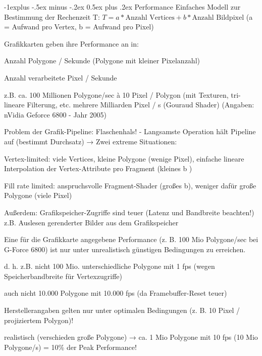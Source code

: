 \documentclass[landscape]{article}
\makeatletter
\renewcommand{\subsection}{\@startsection{subsection}{2}{0mm}%
                                {-1explus -.5ex minus -.2ex}%
                                {0.5ex plus .2ex}%
                                {\normalfont\normalsize\bfseries}}
\makeatother
\begin{document}
\begin{multicols}{3}
  \subsection{Performance}
  Einfaches Modell zur Bestimmung der Rechenzeit T:
  $T = a * \text{Anzahl Vertices} + b * \text{Anzahl Bildpixel}$ (a = Aufwand pro Vertex, b = Aufwand pro Pixel)
  
  \begin{itemize*}
    \item Grafikkarten geben ihre Performance an in:
    \begin{itemize*}
      \item  Anzahl Polygone / Sekunde (Polygone mit kleiner Pixelanzahl)
      \item Anzahl verarbeitete Pixel / Sekunde
      \item  z.B. ca. 100 Millionen Polygone/sec à 10 Pixel / Polygon (mit Texturen, tri-lineare Filterung, etc. mehrere Milliarden Pixel / s (Gouraud Shader) (Angaben: nVidia Geforce 6800 - Jahr 2005)
    \end{itemize*}
    \item Problem der Grafik-Pipeline: Flaschenhals! - Langsamste Operation hält Pipeline auf (bestimmt Durchsatz) → Zwei extreme Situationen:
    \begin{itemize*}
      \item  Vertex-limited: viele Vertices, kleine Polygone (wenige Pixel), einfache lineare Interpolation der Vertex-Attribute pro Fragment (kleines b )
      \item  Fill rate limited: anspruchsvolle Fragment-Shader (großes b), weniger dafür große Polygone (viele Pixel)
    \end{itemize*}
    \item Außerdem: Grafikspeicher-Zugriffe sind teuer (Latenz und Bandbreite beachten!) z.B. Auslesen gerenderter Bilder aus dem Grafikspeicher
    \item Eine für die Grafikkarte angegebene Performance (z. B. 100 Mio Polygone/sec bei G-Force 6800) ist nur unter unrealistisch günstigen Bedingungen zu erreichen.
    \begin{itemize*}
      \item  d. h. z.B. nicht 100 Mio. unterschiedliche Polygone mit 1 fps (wegen Speicherbandbreite für Vertexzugriffe)
      \item  auch nicht 10.000 Polygone mit 10.000 fps (da Framebuffer-Reset teuer)
      \item  Herstellerangaben gelten nur unter optimalen Bedingungen (z. B. 10 Pixel / projiziertem Polygon)!
      \item  realistisch (verschieden große Polygone) → ca. 1 Mio Polygone mit 10 fps (10 Mio Polygone/s) = 10\% der Peak Performance!
    \end{itemize*}
  \end{itemize*}
  

\end{multicols}
\end{document}
